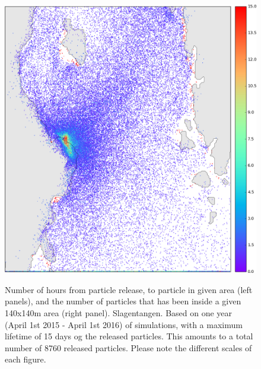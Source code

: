 \begin{figure}[ht]
{\includegraphics*[width=.5\textwidth]{Figurer/opendrift/opendrift_slagen_consentration_zoom_crop}
}
\caption{\small
Number of hours from particle release, to particle in given area (left panels), and the number of particles that has been inside a given 140x140m area (right panel). Slagentangen. Based on one year (April 1st 2015 - April 1st 2016) of simulations, with a maximum lifetime of 15 days og the released particles. This amounts to a total number of 8760 released particles. Please note the different scales of each figure.}
\label{fig:opendrift_slagen1}
\end{figure}

